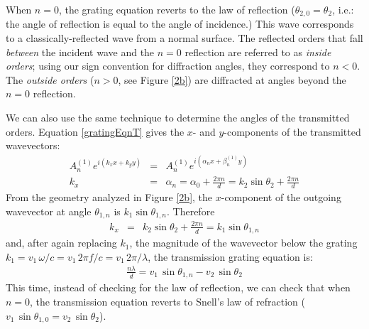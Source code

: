 When $n=0$, the grating equation reverts to the law of reflection ($\theta_{2,0} = \theta_2$, i.e.: the angle of reflection is equal to the angle of incidence.)  This wave corresponds to a classically-reflected wave from a normal surface.  The reflected orders that fall \emph{between} the incident wave and the $n=0$ reflection are referred to as \emph{inside orders}; using our sign convention for diffraction angles, they correspond to $n<0$.  The \emph{outside orders} ($n>0$, see Figure \ref{2b}) are diffracted at angles beyond the $n=0$ reflection.

We can also use the same technique to determine the angles of the transmitted orders.  Equation \ref{gratingEqnT} gives the $x$- and $y$-components of the transmitted wavevectors:
\begin{eqnarray}
A^{(1)}_n e^{i(k_x x + k_y y)} &=& A^{(1)}_n e^{i(\alpha_n x + \beta^{(1)}_n y)} \\
k_x &=& \alpha_n = \alpha_0 + \frac{ 2\pi n}{d} = k_2 \sin \theta_2 +\frac{ 2\pi n}{d}
\end{eqnarray}
From the geometry analyzed in Figure \ref{2b}, the $x$-component of the outgoing wavevector at angle $\theta_{1,n}$ is $k_1 \sin \theta_{1,n}$.  Therefore
\begin{eqnarray}
\label{kxEqn1}
k_x &=& k_2 \sin \theta_2 +\frac{ 2\pi n}{d} = k_1 \sin \theta_{1,n}
\end{eqnarray}
and, after again replacing $k_1$, the magnitude of the wavevector below the grating $k_1 = v_1\, \omega / c = v_1 \, 2\pi f / c =  v_1 \, 2\pi / \lambda$, the transmission grating equation is:
\begin{eqnarray}
\label{gratingEquation}
\frac{n \lambda}{d} = v_1 \, \sin \theta_{1,n} -  v_2 \, \sin \theta_{2}
\end{eqnarray}
This time, instead of checking for the law of reflection, we can check that when $n=0$, the transmission equation reverts to Snell's law of refraction ($v_1\, \sin \theta_{1,0} = v_2 \, \sin \theta_2$).

